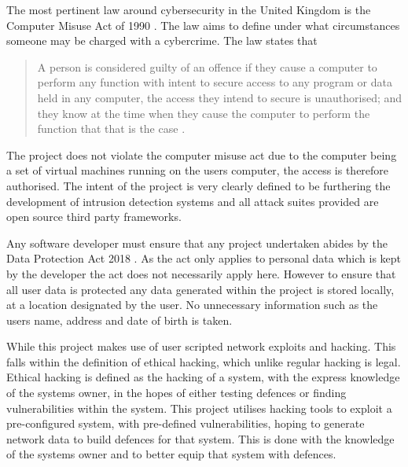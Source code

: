 The most pertinent law around cybersecurity in the United Kingdom is the Computer Misuse Act of 1990 \cite{cmua}. The law aims to define under what circumstances someone may be charged with a cybercrime. The law states that 
\begin{quote}
     A person is considered guilty of an offence if they cause a computer to perform any function with intent to secure access to any program or data held in any computer, the access they intend to secure is unauthorised; and they know at the time when they cause the computer to perform the function that that is the case \cite{cmua}.
\end{quote}
 The project does not violate the computer misuse act due to the computer being a set of virtual machines running on the users computer, the access is therefore authorised. The intent of the project is very clearly defined to be furthering the development of intrusion detection systems and all attack suites provided are open source third party frameworks.
 
Any software developer must ensure that any project undertaken abides by the Data Protection Act 2018 \cite{dpa}. As the act only applies to personal data which is kept by the developer the act does not necessarily apply here. However to ensure that all user data is protected any data generated within the project is stored locally, at a location designated by the user. No unnecessary information such as the users name, address and date of birth is taken. 

While this project makes use of user scripted network exploits and hacking. This falls within the definition of ethical hacking, which unlike regular hacking is legal. Ethical hacking is defined as the hacking of a system, with the express knowledge of the systems owner, in the hopes of either testing defences or finding vulnerabilities within the system\cite{ethhak}. This project utilises hacking tools to exploit a pre-configured system, with pre-defined vulnerabilities, hoping to generate network data to build defences for that system. This is done with the knowledge of the systems owner and to better equip that system with defences. 






